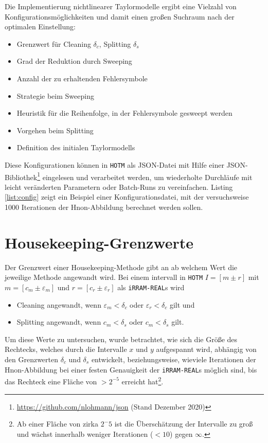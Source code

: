 Die Implementierung nichtlinearer Taylormodelle ergibt eine Vielzahl von Konfigurationsmöglichkeiten und damit einen großen Suchraum nach der optimalen Einstellung:
\begin{itemize}
 \item Grenzwert für Cleaning $\delta_c$, Splitting $\delta_s$
 \item Grad der Reduktion durch Sweeping
 \item Anzahl der zu erhaltenden Fehlersymbole
 \item Strategie beim Sweeping
 \item Heuristik für die Reihenfolge, in der Fehlersymbole gesweept werden
 \item Vorgehen beim Splitting
 \item Definition des initialen Taylormodells
\end{itemize}
Diese Konfigurationen können in \verb+HOTM+ als JSON-Datei mit Hilfe einer JSON-Bibliothek\footnote{\url{https://github.com/nlohmann/json} (Stand Dezember 2020)} eingelesen und verarbeitet werden, um wiederholte Durchläufe mit leicht veränderten Parametern oder Batch-Runs zu vereinfachen. Listing \ref{list:config} zeigt ein Beispiel einer Konfigurationsdatei, mit der versuchsweise 1000 Iterationen der H\e non-Abbildung berechnet werden sollen. 



\section{Housekeeping-Grenzwerte}
Der Grenzwert einer Housekeeping-Methode gibt an ab welchem Wert die jeweilige Methode angewandt wird. Bei einem intervall in \verb+HOTM+ $I=[m \pm r]$ mit $m = [c_m \pm \varepsilon_m]$ und $r = [c_r \pm \varepsilon_r]$ als \verb+iRRAM-REAL+s wird
\begin{itemize}
 \item Cleaning angewandt, wenn $\varepsilon_m < \delta_c$ oder $\varepsilon_r < \delta_c$ gilt und
 \item Splitting angewandt, wenn $c_m < \delta_s$ oder $c_m < \delta_s$ gilt.
\end{itemize}
Um diese Werte zu untersuchen, wurde betrachtet, wie sich die Größe des Rechtecks, welches durch die Intervalle $x$ und $y$ aufgespannt wird, abhängig von den Grenzwerten $\delta_c$ und $\delta_s$ entwickelt, beziehungsweise, wieviele Iterationen der H\e non-Abbildung bei einer festen Genauigkeit der \verb+iRRAM-REAL+s möglich sind, bis das Rechteck eine Fläche von $>2^{-5}$ erreicht hat\footnote{Ab einer Fläche von zirka $2^-{5}$ ist die Überschätzung der Intervalle zu groß und wächst innerhalb weniger Iterationen ($< 10$) gegen $\infty$.}.


